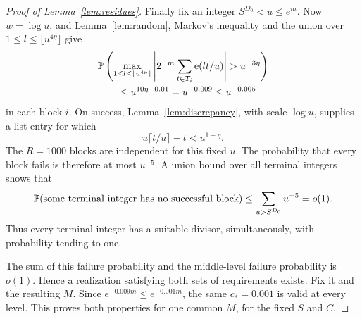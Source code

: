 \begin{proof}[Proof of Lemma~\ref{lem:residues}]
Finally fix an integer \(S^{D_0}<u\le e^m\).
Now \(w=\log u\), and Lemma~\ref{lem:random}, Markov's inequality and
the union over \(1\le l\le\lfloor u^{4\eta}\rfloor\) give
\begin{align*}
 &
 \Prob\left(
  \max_{1\le l\le\lfloor u^{4\eta}\rfloor}
   \left|2^{-m}\sum_{t\in T_i}\e(lt/u)\right|>u^{-3\eta}
 \right)\\
 &\hspace{2em}\le u^{10\eta-0.01}
 =u^{-0.009}\le u^{-0.005}
\end{align*}
in each block \(i\).  On success, Lemma~\ref{lem:discrepancy}, with
scale \(\log u\), supplies a list entry for which
\[
 u\lceil t/u\rceil-t<u^{1-\eta}.
\]
The \(R=1000\) blocks are independent for this fixed \(u\).
The probability that every block fails is therefore at most \(u^{-5}\).
A union bound over all terminal integers shows that
\[
 \mathbb P(\text{some terminal integer has no successful block})
 \le \sum_{u>S^{D_0}}u^{-5}=o(1).
\]
Thus every terminal integer has a suitable divisor, simultaneously,
with probability tending to one.

The sum of this failure probability and the middle-level failure
probability is \(o(1)\).  Hence a realization satisfying both sets of
requirements exists.  Fix it and the resulting \(M\).
Since \(e^{-0.009m}\le e^{-0.001m}\), the same
\(c_*=0.001\) is valid at every level.  This proves both properties for
one common \(M\), for the fixed \(S\) and \(C\).
\end{proof}
